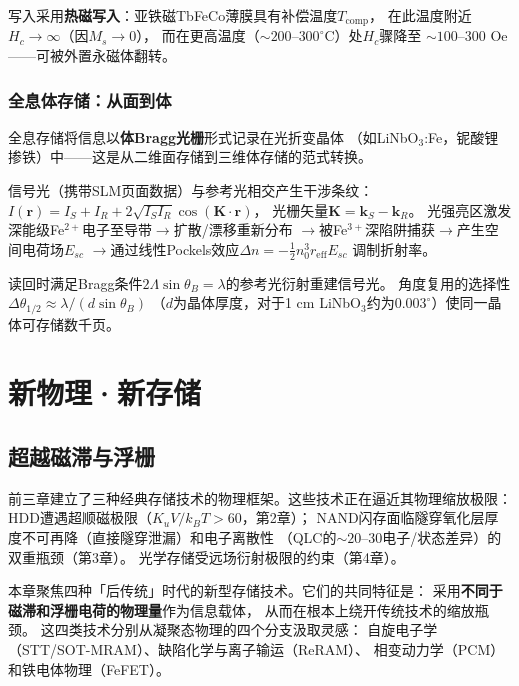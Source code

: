 \documentclass[11pt,a4paper,openany]{book}
\theoremstyle{definition}
\theoremstyle{plain}
\theoremstyle{remark}
\begin{document}
写入采用\textbf{热磁写入}：亚铁磁TbFeCo薄膜具有补偿温度$T_{\text{comp}}$，
在此温度附近$H_c \to \infty$（因$M_s \to 0$），
而在更高温度（$\sim 200$--$300^\circ$C）处$H_c$骤降至
$\sim 100$--$300$ Oe——可被外置永磁体翻转。

\subsection{全息体存储：从面到体}

全息存储将信息以\textbf{体Bragg光栅}形式记录在光折变晶体
（如LiNbO$_3$:Fe，铌酸锂掺铁）中——这是从二维面存储到三维体存储的范式转换。

信号光（携带SLM页面数据）与参考光相交产生干涉条纹：
$I(\mathbf{r}) = I_S + I_R + 2\sqrt{I_S I_R}\cos(\mathbf{K}\cdot\mathbf{r})$，
光栅矢量$\mathbf{K} = \mathbf{k}_S - \mathbf{k}_R$。
光强亮区激发深能级Fe$^{2+}$电子至导带$\to$扩散/漂移重新分布
$\to$被Fe$^{3+}$深陷阱捕获$\to$产生空间电荷场$E_{sc}$
$\to$通过线性Pockels效应$\Delta n = -\frac12 n_0^3 r_{\text{eff}} E_{sc}$
调制折射率。

读回时满足Bragg条件$2\Lambda\sin\theta_B = \lambda$的参考光衍射重建信号光。
角度复用的选择性$\Delta\theta_{1/2} \approx \lambda/(d\sin\theta_B)$
（$d$为晶体厚度，对于1 cm LiNbO$_3$约为$0.003^\circ$）使同一晶体可存储数千页。

\chapter{新物理·新存储}
\label{ch:emerging}

\section{超越磁滞与浮栅}

前三章建立了三种经典存储技术的物理框架。这些技术正在逼近其物理缩放极限：
HDD遭遇超顺磁极限（$K_u V/k_B T > 60$，第2章）；
NAND闪存面临隧穿氧化层厚度不可再降（直接隧穿泄漏）和电子离散性
（QLC的$\sim 20$--$30$电子/状态差异）的双重瓶颈（第3章）。
光学存储受远场衍射极限的约束（第4章）。

本章聚焦四种「后传统」时代的新型存储技术。它们的共同特征是：
采用\textbf{不同于磁滞和浮栅电荷的物理量}作为信息载体，
从而在根本上绕开传统技术的缩放瓶颈。
这四类技术分别从凝聚态物理的四个分支汲取灵感：
自旋电子学（STT/SOT-MRAM）、缺陷化学与离子输运（ReRAM）、
相变动力学（PCM）和铁电体物理（FeFET）。
\end{document}
